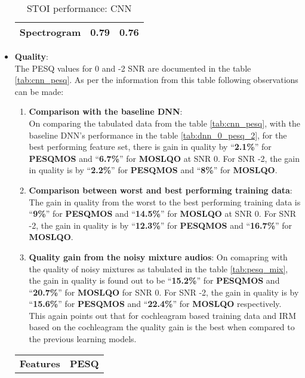 \begin{itemize}
\begin{table}[!htbp]
\begin{tabular}{ |p{12cm}|p{1.7cm}|p{1.7cm}|  }
\hline
Spectrogram	& 0.79	& 0.76\\
\hline
\end{tabular}
\caption{STOI performance: CNN}
\label{tab:cnn_stoi}
\end{table}
\item \textbf{Quality}:\\
The PESQ values for 0 and -2 SNR are documented in the table \ref{tab:cnn_pesq}. As per the information from this table following observations can be made:
\begin{enumerate}
\item \textbf{Comparison with the baseline DNN}:\\
On comparing the tabulated data from the table \ref{tab:cnn_pesq}, with the baseline DNN's performance in the table \ref{tab:dnn_0_pesq_2}, for the best performing feature set, there is gain in quality by \enquote{\textbf{2.1\%}} for \textbf{PESQMOS} and \enquote{\textbf{6.7\%}} for \textbf{MOSLQO} at SNR 0. For SNR -2, the gain in quality is by \enquote{\textbf{2.2\%}} for \textbf{PESQMOS} and \enquote{\textbf{8\%}} for \textbf{MOSLQO}.
\item \textbf{Comparison between worst and best performing training data}:\\
The gain in quality from the worst to the best performing training data is
\enquote{\textbf{9\%}} for \textbf{PESQMOS} and \enquote{\textbf{14.5\%}} for \textbf{MOSLQO} at SNR 0. For SNR -2, the gain in quality is by \enquote{\textbf{12.3\%}} for \textbf{PESQMOS} and \enquote{\textbf{16.7\%}} for \textbf{MOSLQO}.
\item \textbf{Quality gain from the noisy mixture audios}:
On comapring with the quality of noisy mixtures as tabulated in the table \ref{tab:pesq_mix}, the gain in quality is found out to be \enquote{\textbf{15.2\%}} for \textbf{PESQMOS} and \enquote{\textbf{20.7\%}} for \textbf{MOSLQO} for SNR 0. For SNR -2, the gain in quality is by \enquote{\textbf{15.6\%}} for \textbf{PESQMOS} and \enquote{\textbf{22.4\%}} for \textbf{MOSLQO} respectively.\\
This again points out that for cochleagram based training data and IRM based on the cochleagram the quality gain is the best when compared to the previous learning models. 
\end{enumerate}
\begin{table}[!htbp]
\centering
\begin{tabular}{ |p{8cm}|p{1.7cm}|p{1.7cm}|p{1.7cm}|p{1.7cm}|  }
\hline
\textbf{Features} & \multicolumn{4}{|c|}{\textbf{PESQ}}\\

\end{tabular}
\end{table}
\end{itemize}
